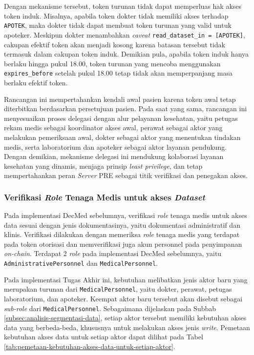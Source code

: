 Dengan mekanisme tersebut, token turunan tidak dapat memperluas hak akses token induk. Misalnya, apabila token dokter tidak memiliki akses terhadap \texttt{APOTEK}, maka dokter tidak dapat membuat token turunan yang valid untuk apoteker. Meskipun dokter menambahkan \textit{caveat} \texttt{read\_dataset\_in = [APOTEK]}, cakupan efektif token akan menjadi kosong karena batasan tersebut tidak termasuk dalam cakupan token induk. Demikian pula, apabila token induk hanya berlaku hingga pukul 18.00, token turunan yang mencoba menggunakan \texttt{expires\_before} setelah pukul 18.00 tetap tidak akan memperpanjang masa berlaku efektif token.

Rancangan ini mempertahankan kendali awal pasien karena token awal tetap diterbitkan berdasarkan persetujuan pasien. Pada saat yang sama, rancangan ini menyesuaikan proses delegasi dengan alur pelayanan kesehatan, yaitu petugas rekam medis sebagai koordinator akses awal, perawat sebagai aktor yang melakukan pemeriksaan awal, dokter sebagai aktor yang menentukan tindakan medis, serta laboratorium dan apoteker sebagai aktor layanan pendukung. Dengan demikian, mekanisme delegasi ini mendukung kolaborasi layanan kesehatan yang dinamis, menjaga prinsip \textit{least privilege}, dan tetap mempertahankan peran \textit{Server} PRE sebagai titik verifikasi dan penegakan akses.

\subsubsection{Verifikasi \textit{Role} Tenaga Medis untuk akses \textit{Dataset}}
\label{subsubsec:verifikasi-role-tenaga-medis-untuk-akses-dataset}

Pada implementasi DecMed sebelumnya, verifikasi \textit{role} tenaga medis untuk akses data sesuai dengan jenis dokumentasinya, yaitu dokumentasi administratif dan klinis. Verifikasi dilakukan dengan memeriksa \textit{role} tenaga medis yang terdapat pada token otorisasi dan memverifikasi juga akun personnel pada penyimpanan \textit{on-chain}. Terdapat 2 \textit{role} pada implementasi DecMed sebelumnya, yaitu \texttt{AdministrativePersonnel} dan \texttt{MedicalPersonnel}.

Pada implementasi Tugas Akhir ini, kebutuhan melibatkan jenis aktor baru yang merupakan turunan dari \texttt{MedicalPersonnel}, yaitu dokter, perawat, petugas laboratorium, dan apoteker. Keempat aktor baru tersebut akan disebut sebagai \textit{sub-role} dari \texttt{MedicalPersonnel}. Sebagaimana dijelaskan pada Subbab \ref{subsec:analisis-segmentasi-data}, setiap aktor tersebut memiliki kebutuhan akses data yang berbeda-beda, khususnya untuk melakukan akses jenis \textit{write}. Pemetaan kebutuhan akses data untuk setiap aktor dapat dilihat pada Tabel \ref{tab:pemetaan-kebutuhan-akses-data-untuk-setiap-aktor}.

